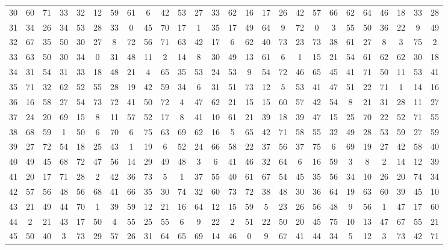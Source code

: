 \begin{table}
\begin{tabular}{c c c c c c c c c c c c c c c c c c c c c c c c c c }
30 & 60 & 71 & 33 & 32 & 12 & 59 & 61 & 6 & 42 & 53 & 27 & 33 & 62 & 16 & 17 & 26 & 42 & 57 & 66 & 62 & 64 & 46 & 18 & 33 & 28 \\
31 & 34 & 26 & 34 & 53 & 28 & 33 & 0 & 45 & 70 & 17 & 1 & 35 & 17 & 49 & 64 & 9 & 72 & 0 & 3 & 55 & 50 & 36 & 22 & 9 & 49 \\
32 & 67 & 35 & 50 & 30 & 27 & 8 & 72 & 56 & 71 & 63 & 42 & 17 & 6 & 62 & 40 & 73 & 23 & 73 & 38 & 61 & 27 & 8 & 3 & 75 & 2 \\
33 & 63 & 50 & 30 & 34 & 0 & 31 & 48 & 11 & 2 & 14 & 8 & 30 & 49 & 13 & 61 & 6 & 1 & 15 & 21 & 54 & 61 & 62 & 62 & 30 & 18 \\
34 & 31 & 54 & 31 & 33 & 18 & 48 & 21 & 4 & 65 & 35 & 53 & 24 & 53 & 9 & 54 & 72 & 46 & 65 & 45 & 41 & 71 & 50 & 11 & 53 & 41 \\
35 & 71 & 32 & 62 & 52 & 55 & 28 & 19 & 42 & 59 & 34 & 6 & 31 & 51 & 73 & 12 & 5 & 53 & 41 & 47 & 51 & 22 & 71 & 1 & 14 & 16 \\
36 & 16 & 58 & 27 & 54 & 73 & 72 & 41 & 50 & 72 & 4 & 47 & 62 & 21 & 15 & 15 & 60 & 57 & 42 & 54 & 8 & 21 & 31 & 28 & 11 & 27 \\
37 & 24 & 20 & 69 & 15 & 8 & 11 & 57 & 52 & 17 & 8 & 41 & 10 & 61 & 21 & 39 & 18 & 39 & 47 & 15 & 25 & 70 & 22 & 52 & 71 & 55 \\
38 & 68 & 59 & 1 & 50 & 6 & 70 & 6 & 75 & 63 & 69 & 62 & 16 & 5 & 65 & 42 & 71 & 58 & 55 & 32 & 49 & 28 & 53 & 59 & 27 & 59 \\
39 & 27 & 72 & 54 & 18 & 25 & 43 & 1 & 19 & 6 & 52 & 24 & 66 & 58 & 22 & 37 & 56 & 37 & 75 & 6 & 69 & 19 & 27 & 42 & 58 & 40 \\
40 & 49 & 45 & 68 & 72 & 47 & 56 & 14 & 29 & 49 & 48 & 3 & 6 & 41 & 46 & 32 & 64 & 6 & 16 & 59 & 3 & 8 & 2 & 14 & 12 & 39 \\
41 & 20 & 17 & 71 & 28 & 2 & 42 & 36 & 73 & 5 & 1 & 37 & 55 & 40 & 61 & 67 & 54 & 45 & 35 & 56 & 34 & 10 & 26 & 20 & 74 & 34 \\
42 & 57 & 56 & 48 & 56 & 68 & 41 & 66 & 35 & 30 & 74 & 32 & 60 & 73 & 72 & 38 & 48 & 30 & 36 & 64 & 19 & 63 & 60 & 39 & 45 & 10 \\
43 & 21 & 49 & 44 & 70 & 1 & 39 & 59 & 12 & 21 & 16 & 64 & 12 & 15 & 59 & 5 & 23 & 26 & 56 & 48 & 9 & 56 & 1 & 47 & 17 & 60 \\
44 & 2 & 21 & 43 & 17 & 50 & 4 & 55 & 25 & 55 & 6 & 9 & 22 & 2 & 51 & 22 & 50 & 20 & 45 & 75 & 10 & 13 & 47 & 67 & 55 & 21 \\
45 & 50 & 40 & 3 & 73 & 29 & 57 & 26 & 31 & 64 & 65 & 69 & 14 & 46 & 0 & 9 & 67 & 41 & 44 & 34 & 5 & 12 & 3 & 73 & 42 & 71 \\

\end{tabular}
\end{table}
